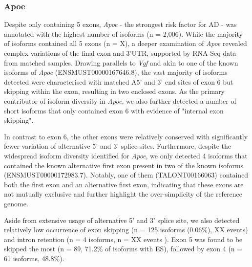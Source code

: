 \newpage
\subsubsection{Apoe}
Despite only containing 5 exons, \textit{Apoe} - the strongest risk factor for AD - was annotated with the highest number of isoforms (n = 2,006). While the majority of isoforms contained all 5 exons (n = X), a deeper examination of \textit{Apoe} revealed complex variations of the final exon and 3'UTR, 
supported by RNA-Seq data from matched samples. Drawing parallels to \textit{Vgf} and akin to one of the known isoforms of \textit{Apoe} (ENSMUST00000167646.8), the vast majority of isoforms detected were characterised with matched A5' and 3' end sites of exon 6 but skipping within the exon, resulting in two enclosed exons. As the primary contributor of isoform diversity in \textit{Apoe}, we also further detected a number of short isoforms that only contained exon 6 with evidence of "internal exon skipping". 

In contrast to exon 6, the other exons were relatively conserved with significantly fewer variation of alternative 5' and 3' splice sites. Furthermore, despite the widespread isoform diversity identified for \textit{Apoe}, we only detected 4 isoforms that contained the known alternative first exon present in two of the known isoforms (ENSMUST00000172983.7). Notably, one of them (TALONT00166063) contained both the first exon and an alternative first exon, indicating that these exons are not mutually exclusive and further highlight the over-simplicity of the reference genome. 

Aside from extensive usage of alternative 5' and 3' splice site, we also detected relatively low occurrence of exon skipping (n = 125 isoforms (0.06\%), XX events) and intron retention (n = 4 isoforms, n = XX events ). Exon 5 was found to be skipped the most (n = 89, 71.2\% of isoforms with ES), followed by exon 4 (n = 61 isoforms, 48.8\%). 

